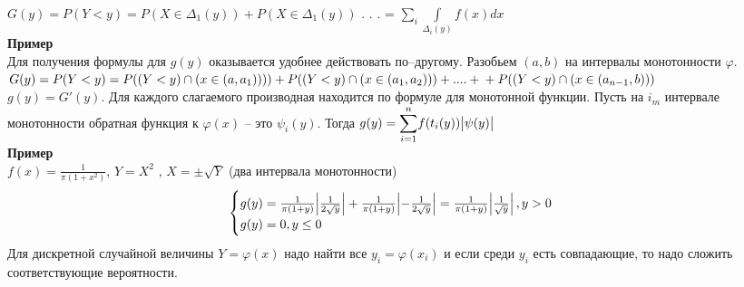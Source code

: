 \documentclass[russian, 12pt, fleqn]{article}
\begin{document}
$G(y) = P(Y<y) = P(X \in \Delta_1(y)) + P(X \in \Delta_1(y))$ . . . = $\displaystyle{\sum_{i}}  \displaystyle{\int\limits_{\Delta_i(y)} } f(x) dx$\\
\textbf{Пример} \\
Для получения формулы для $g(y)$ оказывается удобнее действовать по--другому. Разобьем $(a, b)$ на интервалы монотонности $\varphi$.\\
$G(y) = P(Y<y) = P((Y < y) \cap (x \in (a, a_1)))) + P((Y < y) \cap (x \in (a_1, a_2)))  +  ....  + \\+P((Y < y) \cap (x \in (a_{n-1}, b)))$\\
$g(y) = G'(y)$. Для каждого слагаемого производная находится по формуле для монотонной функции. Пусть на $i_m$ интервале монотонности обратная функция к $\varphi(x)$ -- это $\psi_i(y)$. Тогда $g(y) = \displaystyle{\sum\limits_{i = 1}^{n}} f(t_i(y))\abs{\psi(y)}$\\
\textbf{Пример} \\
$f(x) = \frac{1}{\pi (1+x^2)}$, $Y=X^2$ , $X = \pm \sqrt{Y}$ (два интервала монотонности)\\
\begin{equation*} 
 \begin{cases}
   g(y) = \frac{1}{\pi(1+y)} \abs{\frac{1}{2\sqrt{y}}} + \frac{1}{\pi(1+y)} \abs{-\frac{1}{2\sqrt{y}}} = \frac{1}{\pi(1+y)} \abs{\frac{1}{\sqrt{y}}}, y > 0 \\
   g(y) = 0, y \leq 0
 \end{cases}
\end{equation*}
Для дискретной случайной величины $Y=\varphi(x)$ надо найти все $y_i = \varphi(x_i)$ и если среди $y_i$ есть совпадающие, то надо сложить соответствующие вероятности.\\

\end{document}
